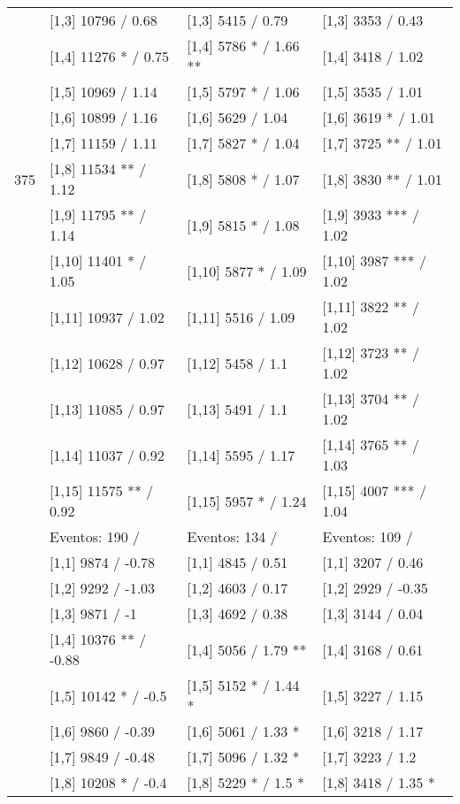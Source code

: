 \begin{table}
\begin{tabular}[t]{llll}
 & {}[1,3] 10796  / 0.68 & {}[1,3] 5415  / 0.79 & {}[1,3] 3353  / 0.43\\
\addlinespace
 & {}[1,4] 11276 * / 0.75 & {}[1,4] 5786 * / 1.66 ** & {}[1,4] 3418  / 1.02\\
 & {}[1,5] 10969  / 1.14 & {}[1,5] 5797 * / 1.06 & {}[1,5] 3535  / 1.01\\
 & {}[1,6] 10899  / 1.16 & {}[1,6] 5629  / 1.04 & {}[1,6] 3619 * / 1.01\\
 & {}[1,7] 11159  / 1.11 & {}[1,7] 5827 * / 1.04 & {}[1,7] 3725 ** / 1.01\\
375 & {}[1,8] 11534 ** / 1.12 & {}[1,8] 5808 * / 1.07 & {}[1,8] 3830 ** / 1.01\\
\addlinespace
 & {}[1,9] 11795 ** / 1.14 & {}[1,9] 5815 * / 1.08 & {}[1,9] 3933 *** / 1.02\\
 & {}[1,10] 11401 * / 1.05 & {}[1,10] 5877 * / 1.09 & {}[1,10] 3987 *** / 1.02\\
 & {}[1,11] 10937  / 1.02 & {}[1,11] 5516  / 1.09 & {}[1,11] 3822 ** / 1.02\\
 & {}[1,12] 10628  / 0.97 & {}[1,12] 5458  / 1.1 & {}[1,12] 3723 ** / 1.02\\
 & {}[1,13] 11085  / 0.97 & {}[1,13] 5491  / 1.1 & {}[1,13] 3704 ** / 1.02\\
\addlinespace
 & {}[1,14] 11037  / 0.92 & {}[1,14] 5595  / 1.17 & {}[1,14] 3765 ** / 1.03\\
 & {}[1,15] 11575 ** / 0.92 & {}[1,15] 5957 * / 1.24 & {}[1,15] 4007 *** / 1.04\\
 & Eventos:  190 / & Eventos:  134 / & Eventos:  109 /\\
 & {}[1,1] 9874  / -0.78 & {}[1,1] 4845  / 0.51 & {}[1,1] 3207  / 0.46\\
 & {}[1,2] 9292  / -1.03 & {}[1,2] 4603  / 0.17 & {}[1,2] 2929  / -0.35\\
\addlinespace
 & {}[1,3] 9871  / -1 & {}[1,3] 4692  / 0.38 & {}[1,3] 3144  / 0.04\\
 & {}[1,4] 10376 ** / -0.88 & {}[1,4] 5056  / 1.79 ** & {}[1,4] 3168  / 0.61\\
 & {}[1,5] 10142 * / -0.5 & {}[1,5] 5152 * / 1.44 * & {}[1,5] 3227  / 1.15\\
 & {}[1,6] 9860  / -0.39 & {}[1,6] 5061  / 1.33 * & {}[1,6] 3218  / 1.17\\
 & {}[1,7] 9849  / -0.48 & {}[1,7] 5096  / 1.32 * & {}[1,7] 3223  / 1.2\\
\addlinespace
500 & {}[1,8] 10208 * / -0.4 & {}[1,8] 5229 * / 1.5 * & {}[1,8] 3418  / 1.35 *\\

\end{tabular}
\end{table}

